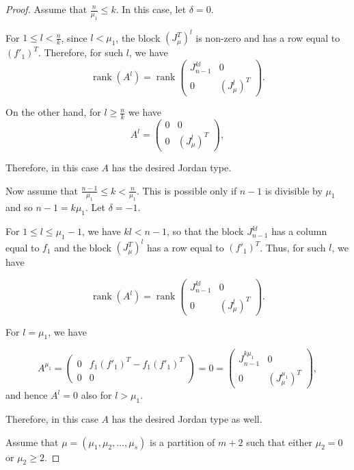 \documentclass[11pt]{amsproc}
\DeclareMathOperator{\rank}{rank}
\begin{document}
\begin{proof}
 Assume that $\frac{n}{\mu_1}\leq k$. In this case, let $\delta=0$. 

For  $1\leq l<\frac{n}{k}$, since $l<\mu_1$, the block $  \left(J^T_{\mu }\right)^l$ is non-zero and has a row equal to $(f'_1)^T$. Therefore, for such $l$, we have 
\[\rank(A^l)=\rank\left(
\begin{array}{c|c}
    J_{n-1}^{kl} &0 \\
    \hline
    0 & \left(J^l_{\mu }\right)^T
\end{array}
\right). \]

On the other hand, for $l\geq \frac{n}{k}$ we have 
\[A^l=\left(
\begin{array}{c|c}
   0 &0 \\
    \hline
    0 & \left(J^l_{\mu }\right)^T
\end{array}
\right), \]

Therefore, in this case $A$ has the desired Jordan type.

 Now assume that $\frac{n-1}{\mu_1}\leq k <\frac{n}{\mu_1}$. This is possible only if $n-1$ is divisible by $\mu_1$ and so $n-1=k\mu_1$. Let $\delta=-1$. 

For $1\leq l \leq \mu_1-1$, we have $kl<n-1$, so that the block $J_{n-1}^{kl}$ has a column equal to $f_1$ and the block $\left(J^T_{\mu }\right)^l$ has a row equal to $(f'_1)^T$. Thus, for such $l$, we have 

\[\rank(A^l)=\rank\left(
\begin{array}{c|c}
    J_{n-1}^{kl} &0 \\
    \hline
    0 & \left(J^l_{\mu }\right)^T
\end{array}
\right). \]

For $l=\mu_1$, we have 

\[A^{\mu_1}=\left(
\begin{array}{c|c}
    0 & f_{1}(f'_1)^T- f_1\left(f'_{1}\right)^T \\
    \hline
    0 & 0
\end{array}
\right)=0=\left(
\begin{array}{c|c}
    J_{n-1}^{k\mu_1} & 0 \\
    \hline
    0 & \left(J^{\mu_1}_{\mu }\right)^{T}
\end{array}
\right), 
\]
and hence $A^l=0$ also for $l>\mu_1$.


Therefore, in this case $A$ has the desired Jordan type as well.


 Assume that $\mu=(\mu_1,\mu_2, \ldots, \mu_s)$ is a partition of $m+2$ such that either $\mu_2=0$ or  $\mu_2\geq 2$. 


\end{proof}
\end{document}
